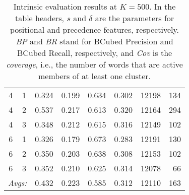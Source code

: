 \begin{enumerate}
{{\begin{table}
{\begin{tabular}{cc|ccccrr}
4 & 1 & 0.324 & 0.199 & 0.634 & 0.302 & 12198 & 134 \\
4 & 2 & 0.537 & 0.217 & 0.613 & 0.320 & 12164 & 294 \\
4 & 3 & 0.348 & 0.212 & 0.615 & 0.316 & 12149 & 102 \\ \hline
6 & 1 & 0.326 & 0.179 & 0.673 & 0.283 & 12191 & 130 \\
6 & 2 & 0.350 & 0.203 & 0.638 & 0.308 & 12153 & 102 \\
6 & 3 & 0.352 & 0.210 & 0.625 & 0.314 & 12078 & 66 \\ \hline\hline
\multicolumn{2}{c|}{\textit{Avgs:}} & 0.432 & 0.223 & 0.585 & 0.312 & 12110 & 163 \\
\end{tabular}
}
\caption{Intrinsic evaluation results at $K = 500$. In the table headers, $s$ and $\delta$ are the parameters for positional and precedence features, respectively. \textit{BP} and \textit{BR} stand for BCubed Precision and BCubed Recall, respectively, and \textit{Cov} is the \textit{coverage}, i.e., the number of words that are active members of at least one cluster.}
\label{tab:intr-500}
\end{table}

}}
\end{enumerate}
